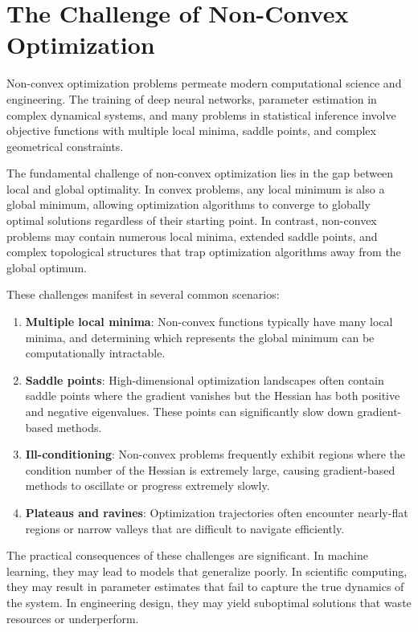 \section{The Challenge of Non-Convex Optimization}

Non-convex optimization problems permeate modern computational science and engineering. The training of deep neural networks, parameter estimation in complex dynamical systems, and many problems in statistical inference involve objective functions with multiple local minima, saddle points, and complex geometrical constraints.

The fundamental challenge of non-convex optimization lies in the gap between local and global optimality. In convex problems, any local minimum is also a global minimum, allowing optimization algorithms to converge to globally optimal solutions regardless of their starting point. In contrast, non-convex problems may contain numerous local minima, extended saddle points, and complex topological structures that trap optimization algorithms away from the global optimum.

These challenges manifest in several common scenarios:

\begin{enumerate}
\item \textbf{Multiple local minima}: Non-convex functions typically have many local minima, and determining which represents the global minimum can be computationally intractable.

\item \textbf{Saddle points}: High-dimensional optimization landscapes often contain saddle points where the gradient vanishes but the Hessian has both positive and negative eigenvalues. These points can significantly slow down gradient-based methods.

\item \textbf{Ill-conditioning}: Non-convex problems frequently exhibit regions where the condition number of the Hessian is extremely large, causing gradient-based methods to oscillate or progress extremely slowly.

\item \textbf{Plateaus and ravines}: Optimization trajectories often encounter nearly-flat regions or narrow valleys that are difficult to navigate efficiently.
\end{enumerate}

The practical consequences of these challenges are significant. In machine learning, they may lead to models that generalize poorly. In scientific computing, they may result in parameter estimates that fail to capture the true dynamics of the system. In engineering design, they may yield suboptimal solutions that waste resources or underperform.

